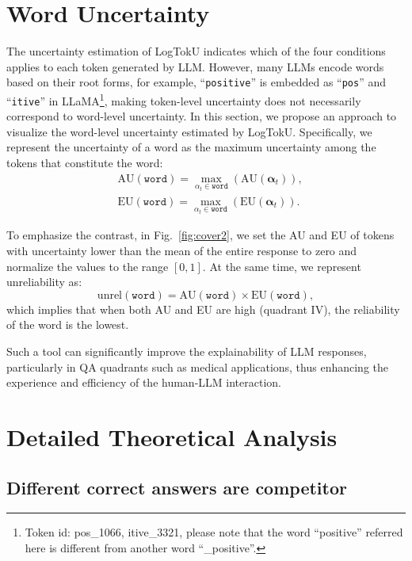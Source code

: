 \section{Word Uncertainty}
The uncertainty estimation of LogTokU indicates which of the four conditions applies to each token generated by LLM. However, many LLMs encode words based on their root forms, for example, ``\texttt{positive}'' is embedded as ``\texttt{pos}'' and ``\texttt{itive}'' in LLaMA\footnote{Token id: pos\_1066, itive\_3321, please note that the word ``positive'' referred here is different from another word ``\_positive''.}, making token-level uncertainty does not necessarily correspond to word-level uncertainty. In this section, we propose an approach to visualize the word-level uncertainty estimated by LogTokU. Specifically, we represent the uncertainty of a word as the maximum uncertainty among the tokens that constitute the word:
\begin{equation}
\begin{aligned}
    &\text{AU}(\texttt{word})=\max_{\alpha_t \in \texttt{word}}(\text{AU}(\bm{\alpha}_t)) ,\\
    &\text{EU}(\texttt{word})=\max_{\alpha_t \in \texttt{word}}(\text{EU}(\bm{\alpha}_t)).
\end{aligned}
\end{equation}


To emphasize the contrast, in Fig.~\ref{fig:cover2}, we set the AU and EU of tokens with uncertainty lower than the mean of the entire response to zero and normalize the values to the range $[0,1]$. At the same time, we represent unreliability as:
\begin{equation}
    \text{unrel}(\texttt{word})={\text{AU}(\texttt{word})\times\text{EU}(\texttt{word})},
\end{equation}
which implies that when both AU and EU are high (quadrant IV), the reliability of the word is the lowest.

Such a tool can significantly improve the explainability of LLM responses, particularly in QA quadrants such as medical applications, thus enhancing the experience and efficiency of the human-LLM interaction.



\section{Detailed Theoretical Analysis}
\subsection{Different correct answers are competitor}

